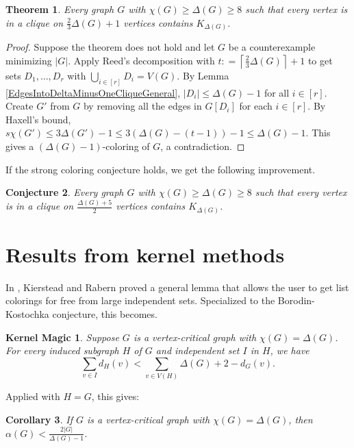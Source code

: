 \documentclass[12pt]{article}
\theoremstyle{plain}
\newtheorem{thm}{Theorem}
\newtheorem{conjecture}[thm]{Conjecture}
\newtheorem{cor}[thm]{Corollary}
\newtheorem*{KernelMagic}{Kernel Magic}
\theoremstyle{definition}
\theoremstyle{remark}
\newcommand{\card}[1]{\left|#1\right|}
\newcommand{\ceil}[1]{\left\lceil#1\right\rceil}
\newcommand{\irange}[1]{\left[#1\right]}
\newcommand{\parens}[1]{\left( #1 \right)}
\newcommand{\DefinedAs}{\mathrel{\mathop:}=}
\begin{document}
\begin{thm}\label{TwoThirdsCliqueCorImproved}
Every graph $G$ with $\chi(G) \ge \Delta(G) \ge 8$ such that every
vertex is in a clique on $\frac23\Delta(G) + 1$ vertices contains $K_{\Delta(G)}$.
\end{thm}
\begin{proof}
Suppose the theorem does not hold and let $G$ be a counterexample minimizing $\card{G}$.  
Apply Reed's decomposition with $t \DefinedAs \ceil{\frac23\Delta(G)} + 1$ to get sets $D_1, \ldots, D_r$ with $\bigcup_{i\in\irange{r}} D_i = V(G)$.  
By Lemma \ref{EdgesIntoDeltaMinusOneCliqueGeneral}, $\card{D_i} \le \Delta(G) - 1$ for all $i \in \irange{r}$.
Create $G'$ from $G$ by removing all the edges in $G[D_i]$ for each $i \in \irange{r}$.  
By Haxell's bound, $s\chi(G') \le 3\Delta(G') - 1 \le 3(\Delta(G) - (t-1)) - 1 \le \Delta(G)-1$. This gives
a $\parens{\Delta(G)-1}$-coloring of $G$, a contradiction.  
\end{proof}

If the strong coloring conjecture holds, we get the following improvement.

\begin{conjecture}\label{TwoThirdsCliqueCorImprovedMore}
Every graph $G$ with $\chi(G) \ge \Delta(G) \ge 8$ such that every
vertex is in a clique on $\frac{\Delta(G) + 5}{2}$ vertices contains $K_{\Delta(G)}$.
\end{conjecture}


\section{Results from kernel methods}
In \cite{KernelMagic}, Kierstead and Rabern proved a general lemma that allows the user to get list colorings for free from large independent sets.  
Specialized to the Borodin-Kostochka conjecture,
this becomes.

\begin{KernelMagic}
Suppose $G$ is a vertex-critical graph with $\chi(G) = \Delta(G)$.  For every induced subgraph $H$ of $G$ and independent set $I$ in $H$, we have
\[\sum_{v \in I} d_H(v) < \sum_{v \in V(H)} \Delta(G) + 2 - d_G(v).\]
\end{KernelMagic}

Applied with $H=G$, this gives:
\begin{cor}
If $G$ is a vertex-critical graph with $\chi(G) = \Delta(G)$, then $\alpha(G) < \frac{2\card{G}}{\Delta(G)-1}$.
\end{cor}
\end{document}
